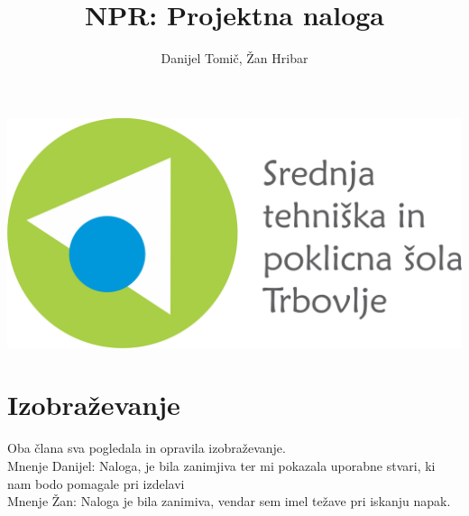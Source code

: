 \documentclass[a4paper]{article}
\author{Danijel Tomič, Žan Hribar}
\title{NPR: Projektna naloga}
\begin{document}
\maketitle

\begin{center}
\includegraphics[scale=0.5]{Logotip-z-napisom.png}
\end{center}
\newpage


\section{Izobraževanje}
Oba člana sva pogledala in opravila izobraževanje.\\
Mnenje Danijel: Naloga, je bila zanimjiva ter mi pokazala uporabne stvari, ki nam bodo pomagale pri izdelavi \\
Mnenje Žan: Naloga je bila zanimiva, vendar sem imel težave pri iskanju napak.
\end{document}
